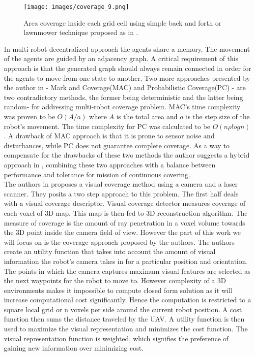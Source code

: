 \begin{figure}[htbp] %
 \centering
   \texttt{[image: images/coverage\_9.png]}
   \caption[Area coverage inside each grid cell using simple back and forth or lawnmower \cite{1}]
   {Area coverage inside each grid cell using simple back and forth or lawnmower technique proposed as in \cite{1}.}   
\label{fig:lmc}
\end{figure}


In multi-robot decentralized approach\cite{1} the agents share a memory. The movement of the agents are guided by an adjacency graph. A critical requirement of this approach is that the generated graph should always remain connected in order for the agents to move from one state to another. 
Two more approaches presented by the author in \cite{1}- Mark and Coverage(MAC) and Probabilistic Coverage(PC) - are two contradictory methods, the former being deterministic and the latter being random- for addressing multi-robot coverage problem. MAC's time complexity was proven to be $O(A/a)$ where $A$ is the total area and $a$ is the step size of the robot's movement. The time complexity for PC was calculated to be $O(n \rho log n)$. A drawback of MAC approach is that it is prone to sensor noise and disturbances, while PC does not guarantee complete coverage. As a way to compensate for the drawbacks of these two methods the author suggests a hybrid approach in \cite{1},   combining these two approaches with a balance between performance and tolerance for mission of continuous covering. \\

The authors in \cite{4} proposes a visual coverage method using a camera and a laser scanner. They posits a two step approach to this problem. The first half deals with a visual coverage descriptor. Visual coverage detector measures coverage of each voxel of 3D map. This map is then fed to 3D reconstruction algorithm. The measure of coverage is the amount of ray penetration in a voxel volume towards the 3D point inside the camera field of view. However the part of this work we will focus on is the coverage approach proposed by the authors. The authors create an utility function that takes into account the amount of visual information the robot's camera takes in for a particular position and orientation. The points in which the camera captures maximum visual features are selected as the next waypoints for the robot to move to. However complexity of a 3D environments makes it impossible to compute closed form solution as it will increase computational cost significantly. Hence the computation is restricted to a square local grid or n voxels per side around the current robot position. A cost function then sums the distance traveled by the UAV. A utility function is then used to maximize the visual representation and minimizes the cost function. The visual representation function is weighted, which signifies the preference of gaining new information over minimizing cost. 

